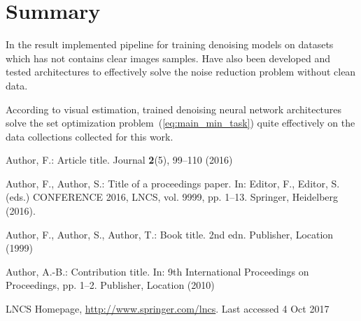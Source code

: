 \documentclass[runningheads]{llncs}
\begin{document}
\section{Summary}
In the result implemented pipeline for training denoising models on datasets which has not contains clear images samples.
Have also been developed and tested architectures to effectively solve the noise reduction problem without clean data. 

According to visual estimation, trained denoising neural network architectures solve the set optimization problem~(\ref{eq:main_min_task}) quite effectively on the data collections collected for this work.




%
%
%
% 
% 
%
\begin{thebibliography}{8}
Author, F.: Article title. Journal \textbf{2}(5), 99--110 (2016)

Author, F., Author, S.: Title of a proceedings paper. In: Editor,
F., Editor, S. (eds.) CONFERENCE 2016, LNCS, vol. 9999, pp. 1--13.
Springer, Heidelberg (2016). 

Author, F., Author, S., Author, T.: Book title. 2nd edn. Publisher,
Location (1999)

Author, A.-B.: Contribution title. In: 9th International Proceedings
on Proceedings, pp. 1--2. Publisher, Location (2010)

LNCS Homepage, \url{http://www.springer.com/lncs}. Last accessed 4
Oct 2017
\end{thebibliography}
\end{document}
